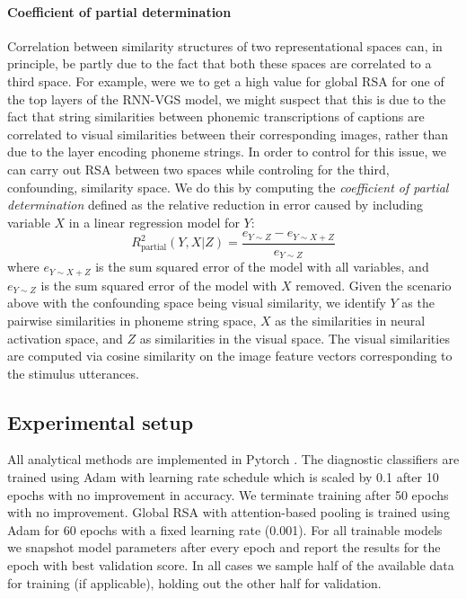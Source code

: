 \paragraph{Coefficient of partial determination}
Correlation between similarity structures of two representational
spaces can, in principle, be partly due to the fact that both these
spaces are correlated to a third space. For example, were we to get a
high value for global RSA for one of the top layers of the RNN-VGS
model, we might suspect that this is due to the fact that string
similarities between phonemic transcriptions of captions are
correlated to visual similarities between their corresponding images,
rather than due to the layer encoding phoneme strings. In order to
control for this issue, we can carry out RSA between two spaces while
controling for the third, confounding, similarity space. We do this by
computing the {\it coefficient of partial determination} defined as the
relative reduction in error caused by including variable $X$ in a linear
regression model for $Y$:
\begin{equation}
  R^2_{\text{partial}}(Y,X|Z) = \frac{e_{Y\sim Z}-e_{Y\sim X+Z}}
    {e_{Y\sim Z}}
\end{equation}
where $e_{Y \sim X+Z}$ is the sum squared error of the model with all
variables, and $e_{Y \sim Z}$ is the sum squared error of the model
with $X$ removed.
Given the scenario above with the confounding space being visual
similarity, we identify $Y$ as the pairwise similarities in phoneme
string space, $X$ as the similarities in neural activation space, and
$Z$ as similarities in the visual space. The visual similarities are
computed via cosine similarity on the image feature vectors
corresponding to the stimulus utterances.


\subsection{Experimental setup}
\label{sec:experimental}
All analytical methods are implemented in Pytorch \citep{NEURIPS2019_9015}. The diagnostic
classifiers are trained using Adam with learning rate schedule which is
scaled by 0.1 after 10 epochs with no improvement in accuracy.  We
terminate training after 50 epochs with no improvement.
Global RSA with attention-based pooling is trained using Adam for 60
epochs with a fixed learning rate (0.001).  For all trainable models
we snapshot model parameters after every epoch and report the results
for the epoch with best validation score.
In all cases we sample half of the available data for training (if
applicable), holding out the other half for validation.

